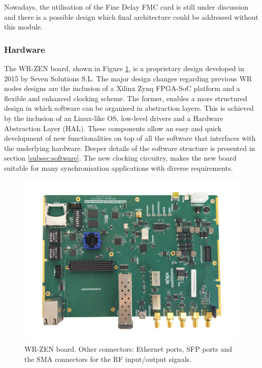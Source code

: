 Nowadays, the utilisation of the Fine Delay FMC card is still under discussion
and there is a possible design which final architecture could be addressed
without this module.

\subsubsection{Hardware} \label{subsec:hardware}

The WR-ZEN board, shown in Figure \ref{fig:wrzen}, is a proprietary design developed in 2015 by Seven Solutions S.L. The major design changes regarding previous WR nodes designs are the inclusion of a Xilinx Zynq FPGA-SoC platform and a flexible and enhanced clocking scheme. The former, enables a more structured design in which software can be organised in abstraction layers. This is achieved by the inclusion of an Linux-like OS, low-level drivers and a
Hardware Abstraction Layer (HAL). These components allow an easy and quick
development of new functionalities on top of all the software that interfaces
with the underlying hardware. Deeper details of the software structure is
presented in section  \ref{subsec:software}. The new clocking circuitry, makes
the new board suitable for many synchronisation applications with diverse
requirements.

\begin{figure}[H] \centering
	\includegraphics[width=0.7\linewidth]{img/wrzenv3_scaled}
	\caption[WR-ZEN board picture]{WR-ZEN board. Other connectors: Ethernet
	ports, SFP ports and the SMA connectors for the RF input/output
signals.} \label{fig:wrzen} 
\end{figure}

